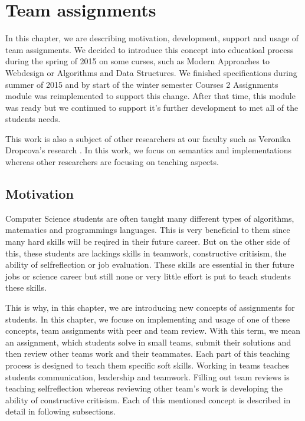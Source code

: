 \chapter{Team assignments}

In this chapter, we are describing motivation, development, support and usage of team assignments. We decided to introduce this concept into educatioal process during the spring of 2015 on some curses, such as Modern Approaches to Webdesign or Algorithms and Data Structures. We finished specifications during summer of 2015 and by start of the winter semester   Courses 2 Assignments module was reimplemented to support this change. After that time, this module was ready but we continued to support it's further development to met all of the students needs.

This work is also a subject of other researchers at our faculty such as Veronika Dropcova's research \cite{dropcova}. In this work, we focus on semantics and implementations whereas other researchers are focusing on teaching aspects.


\section{Motivation}

Computer Science students are often taught many different types of algorithms, matematics and programmings languages. This is very beneficial to them since many hard skills will be reqired in their future career. But on the other side of this, these students are lackings skills in teamwork, constructive critisism, the ability of self\-reflection or job evaluation.  These skills are essential in ther future jobs or science career but still none or very little effort is put to teach students these skills. 

This is why, in this chapter, we are introducing new concepts of assignments for students.  In this chapter, we focuse on implementing and usage of one of these concepts, team assignments with peer and team review. With this term, we mean an assignment, which students solve in small teams, submit their solutions and then review other teams work and their teammates. Each part of this teaching process is designed to teach them specific soft skills. Working in teams teaches students communication, leadership and teamwork. Filling out team reviews is teaching self\-reflection whereas reviewing other team's work is developing the ability of constructive critisism. Each of this mentioned concept is described in detail in following subsections.


